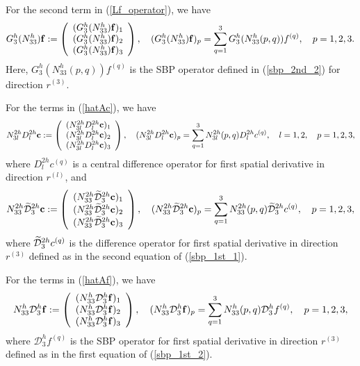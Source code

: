 For the second term in (\ref{Lf_operator}), we have
\begin{align*}\label{3_10_2}
{{G}}_3^{h}({N}_{33}^{h}){\bf f} := \left(\begin{array}{c}
({{G}}_3^{h}({N}_{33}^{h}){\bf f})_1 \\
({{G}}_3^{h}({N}_{33}^{h}){\bf f})_2 \\
({{G}}_3^{h}({N}_{33}^{h}){\bf f})_3 
\end{array}\right), \quad ({{G}}_3^{h}({N}_{33}^{h}){\bf f})_p = \sum_{q = 1}^{3} {G}_3^{h}(N_{33}^{h}(p,q)) {f}^{(q)},\quad p = 1,2,3.
\end{align*}
Here, ${G}_3^{h}(N_{33}^{h}(p,q)) {f}^{(q)}$ is the SBP operator defined in (\ref{sbp_2nd_2}) for direction $r^{(3)}$. 

For the terms in (\ref{hatAc}), we have
\begin{align*}\label{gamma_D} 
{N}_{3l}^{2h}D_l^{2h}{\bf c} := \left(\begin{array}{c}
({N}_{3l}^{2h}D_l^{2h}{\bf c})_1 \\
({N}_{3l}^{2h}D_l^{2h}{\bf c})_2 \\
({N}_{3l}^{2h}D_l^{2h}{\bf c})_3 
\end{array}\right), \quad ({N}_{3l}^{2h}D_l^{2h}{\bf c})_p = \sum_{q = 1}^{3} N_{3l}^{2h}(p,q)D_l^{2h}{c}^{(q)},\quad l = 1,2, \quad p = 1,2,3,
\end{align*}
where $D_l^{2h}{c}^{(q)}$ is a central difference operator for first spatial derivative in direction $r^{(l)}$, and
\begin{align*}\label{3_17}
{N}_{33}^{2h}\wt{\mathcal{D}}_3^{2h}{\bf c} := \left(\begin{array}{c}
({N}_{33}^{2h}\wt{\mathcal{D}}_3^{2h}{\bf c})_1 \\
({N}_{33}^{2h}\wt{\mathcal{D}}_3^{2h}{\bf c})_2 \\
({N}_{33}^{2h}\wt{\mathcal{D}}_3^{2h}{\bf c})_3 
\end{array}\right), \quad ({N}_{33}^{2h}\wt{\mathcal{D}}_3^{2h}{\bf c})_p = \sum_{q = 1}^{3} N_{33}^{2h}(p,q)\wt{\mathcal{D}}_3^{2h}{c}^{(q)},\quad p = 1,2,3,
\end{align*}
where $\widetilde{\mathcal{D}}_3^{2h}{c}^{(q)}$ is the difference operator for first spatial derivative in direction $r^{(3)}$ defined as in the second equation of (\ref{sbp_1st_1}).

For the terms in (\ref{hatAf}), we have
\begin{align*}\label{gamma_D1}
{N}_{33}^h\mathcal{D}_3^h{\bf f} := \left(\begin{array}{c}
({N}_{33}^h\mathcal{D}_3^h{\bf f})_1 \\
({N}_{33}^h\mathcal{D}_3^h{\bf f})_2 \\
({N}_{33}^h\mathcal{D}_3^h{\bf f})_3 
\end{array}\right), \quad ({N}_{33}^h\mathcal{D}_3^h{\bf f})_p = \sum_{q = 1}^{3} N_{33}^h(p,q)\mathcal{D}_3^h{f}^{(q)},\quad p = 1,2,3,
\end{align*}
where $\mathcal{D}_3^h{f}^{(q)}$ is the SBP operator for first spatial derivative in direction $r^{(3)}$ defined as in the first equation of (\ref{sbp_1st_2}).

